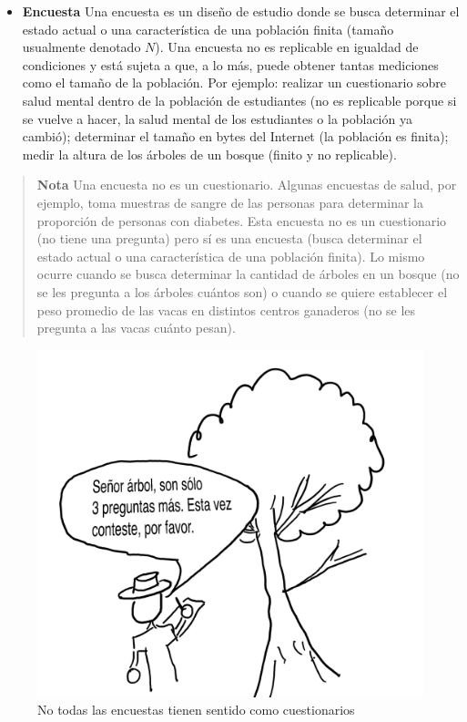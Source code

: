 \documentclass[
]{book}
\providecommand{\tightlist}{%
  \setlength{\itemsep}{0pt}\setlength{\parskip}{0pt}}
\begin{document}
\begin{itemize}
\tightlist
\item
  \textbf{Encuesta} Una encuesta es un diseño de estudio donde se busca determinar el estado actual o una característica de una población finita (tamaño usualmente denotado \(N\)). Una encuesta no es replicable en igualdad de condiciones y está sujeta a que, a lo más, puede obtener tantas mediciones como el tamaño de la población. Por ejemplo: realizar un cuestionario sobre salud mental dentro de la población de estudiantes (no es replicable porque si se vuelve a hacer, la salud mental de los estudiantes o la población ya cambió); determinar el tamaño en bytes del Internet (la población es finita); medir la altura de los árboles de un bosque (finito y no replicable).
\end{itemize}

\begin{quote}
\textbf{Nota} Una encuesta no es un cuestionario. Algunas encuestas de salud, por ejemplo, toma muestras de sangre de las personas para determinar la proporción de personas con diabetes. Esta encuesta no es un cuestionario (no tiene una pregunta) pero sí es una encuesta (busca determinar el estado actual o una característica de una población finita). Lo mismo ocurre cuando se busca determinar la cantidad de árboles en un bosque (no se les pregunta a los árboles cuántos son) o cuando se quiere establecer el peso promedio de las vacas en distintos centros ganaderos (no se les pregunta a las vacas cuánto pesan).
\end{quote}

\begin{figure}
\centering
\includegraphics{images/arbol.png}
\caption{No todas las encuestas tienen sentido como cuestionarios}
\end{figure}
\end{document}
